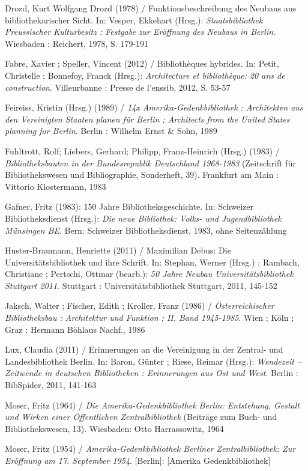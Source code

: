 \documentclass[a4paper,
fontsize=11pt,
oneside,
numbers=noperiodatend,
parskip=half-,
bibliography=totoc,
final
]{scrartcl}
\begin{document}
Drozd, Kurt Wolfgang Drozd (1978) / Funktionsbeschreibung des Neubaus
aus bibliothekarischer Sicht. In: Vesper, Ekkehart (Hrsg.):
\emph{Staatsbibliothek Preussischer Kulturbesitz : Festgabe zur
Eröffnung des Neubaus in Berlin}. Wiesbaden : Reichert, 1978, S. 179-191

Fabre, Xavier ; Speller, Vincent (2012) / Bibliothèques hybrides. In:
Petit, Christelle ; Bonnefoy, Franck (Hrsg.): \emph{Architecture et
bibliothèque: 20 ans de construction}. Villeurbanne : Presse de
l'enssib, 2012, S. 53-57

Feireiss, Kristin (Hrsg.) (1989) / \emph{14x Amerika-Gedenkbibliothek :
Architekten aus den Vereinigten Staaten planen für Berlin ; Architects
from the United States planning for Berlin}. Berlin : Wilhelm Ernst \&
Sohn, 1989

Fuhltrott, Rolf; Liebers, Gerhard; Philipp, Franz-Heinrich (Hrsg.)
(1983) / \emph{Bibliotheksbauten in der Bundesrepublik Deutschland
1968-1983} (Zeitschrift für Bibliothekswesen und Bibliographie,
Sonderheft, 39). Frankfurt am Main : Vittorio Klostermann, 1983

Gafner, Fritz (1983): 150 Jahre Bibliotheksgeschichte. In: Schweizer
Bibliotheksdienst (Hrsg.): \emph{Die neue Bibliothek: Volks- und
Jugendbibliothek Münsingen BE}. Bern: Schweizer Bibliotheksdienst, 1983,
ohne Seitenzählung

Huster-Braumann, Henriette (2011) / Maximilian Debus: Die
Universitätsbibliothek und ihre Schrift. In: Stephan, Werner (Hrsg.) ;
Rambach, Christiane ; Pertschi, Ottmar (bearb.): \emph{50 Jahre Neubau
Universitätsbibliothek Stuttgart 2011}. Stuttgart :
Universitätsbibliothek Stuttgart, 2011, 145-152

Jaksch, Walter ; Fischer, Edith ; Kroller, Franz (1986) /
\emph{Österreichischer Bibliotheksbau : Architektur und Funktion ; II.
Band 1945-1985}. Wien ; Köln ; Graz : Hermann Böhlaus Nachf., 1986

Lux, Claudia (2011) / Erinnerungen an die Vereinigung in der Zentral-
und Landesbibliothek Berlin. In: Baron, Günter ; Riese, Reimar (Hrsg.):
\emph{Wendezeit -- Zeitwende in deutschen Bibliotheken : Erinnerungen
aus Ost und West}. Berlin : BibSpider, 2011, 141-163

Moser, Fritz (1964) / \emph{Die Amerika-Gedenkbibliothek Berlin:
Entstehung, Gestalt und Wirken einer Öffentlichen Zentralbibliothek}
(Beiträge zum Buch- und Bibliothekswesen, 13). Wiesbaden: Otto
Harrassowitz, 1964

Moser, Fritz (1954) / \emph{Amerika-Gedenkbibliothek Berliner
Zentralbibliothek: Zur Eröffnung am 17. September 1954}. {[}Berlin{]}:
{[}Amerika Gedenkbibliothek{]}
\end{document}
